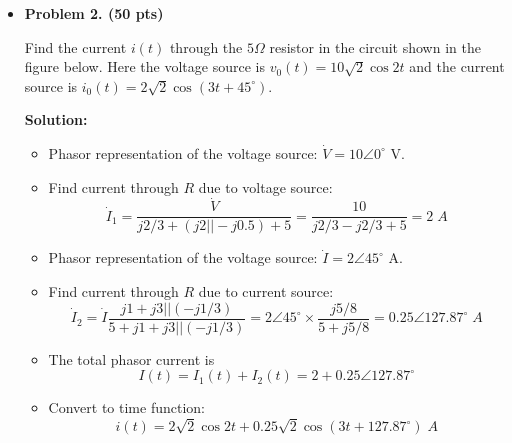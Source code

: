 \begin{itemize}
\item {\bf Problem 2. (50 pts)}

Find the current $i(t)$ through the $5\Omega$ resistor in the circuit shown in the 
figure below. Here the voltage source is $v_0(t)=10\sqrt{2}\cos 2t$ and the current
source is $i_0(t)=2\sqrt{2}\cos(3t+45^\circ)$. 


{\bf Solution:}
\begin{itemize}
\item Phasor representation of the voltage source: $\dot{V}=10\angle 0^\circ$ V.
\item Find current through $R$ due to voltage source:
  \[ \dot{I}_1=\frac{\dot{V}}{j2/3+(j2||-j0.5)+5}=\frac{10}{j2/3-j2/3+5}=2\;A \]
\item Phasor representation of the voltage source: $\dot{I}=2\angle 45^\circ$ A.
\item Find current through $R$ due to current source:
  \[ \dot{I}_2=\dot{I}\frac{j1+j3||(-j1/3)}{5+j1+j3||(-j1/3)}
  =2\angle 45^\circ \times \frac{j5/8}{5+j5/8}=0.25\angle 127.87^\circ\;A \]
\item The total phasor current is
  \[ I(t)=I_1(t)+I_2(t)=2+0.25\angle 127.87^\circ  \]
\item Convert to time function:
  \[ i(t)=2\sqrt{2}\cos 2t+0.25\sqrt{2}\cos(3t+127.87^\circ)\;A \]
\end{itemize}

\end{itemize}

